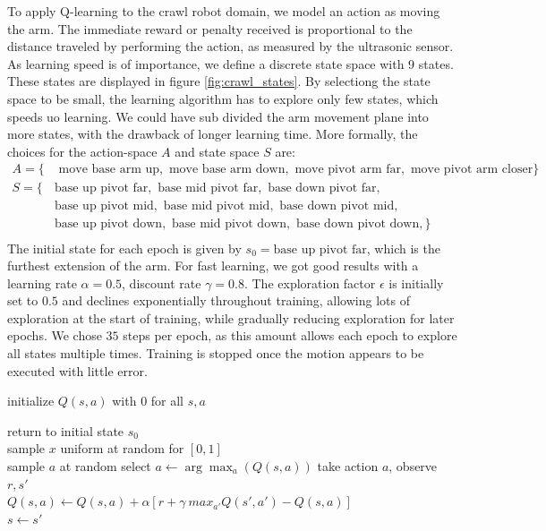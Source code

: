 \documentclass[11pt, a4paper]{article}
\begin{document}
To apply Q-learning to the crawl robot domain, we model an action as moving the arm. The immediate reward or penalty received is proportional to the distance traveled by performing the action, as measured by the ultrasonic sensor. As learning speed is of importance, we define a discrete state space with 9 states. These states are displayed in figure \ref{fig:crawl_states}. By selectiong the state space to be small, the learning algorithm has to explore only few states, which speeds uo learning. We could have sub divided the arm movement plane into more states, with the drawback of longer learning time. More formally, the choices for the action-space $A$ and state space $S$ are:
\begin{align*}
	A = \{ &\text{ move base arm up}, \text{ move base arm down} , \text{ move pivot arm far}, \text{ move pivot arm closer}\} \\
	S = \{ &\text{base up pivot far}, \text{ base mid pivot far}, \text{ base down pivot far}, \\
	       &\text{base up pivot mid}, \text{ base mid pivot mid}, \text{ base down pivot mid},\\
	       &\text{base up pivot down}, \text{ base mid pivot down}, \text{ base down pivot down},\} \\
\end{align*}
The initial state for each epoch is given by $s_0 = \text{base up pivot far}$, which is the furthest extension of the arm. For fast learning, we got good results with a learning rate $\alpha = 0.5$, discount rate $\gamma = 0.8$. The exploration factor $\epsilon$ is initially set to $0.5$ and declines exponentially throughout training, allowing lots of exploration at the start of training, while gradually reducing exploration for later epochs. We chose $35$ steps per epoch, as this amount allows each epoch to explore all states multiple times. Training is stopped once the motion appears to be executed with little error.

\begin{algorithm}[H]
	
	\Input{learning rate $\alpha \in ]0,1]$, discount rate $\gamma \in [0,1[$}
	initialize $Q(s, a)$ with $0$ for all $s,a$\\
	{
		return to initial state $s_0$ \\
		{
			sample $x$ uniform at random for $[0,1]$ \\
			{sample $a$ at random}
			{select $a \leftarrow \arg \max_a(Q(s,a))$}	
			take action $a$, observe $r, s'$ \\
			$Q(s,a) \leftarrow Q(s,a) + \alpha [r + \gamma \  max_{a'} Q(s', a') - Q(s,a)]$ \\
			$s \leftarrow s'$
		}
		
	}
	\caption{Q-learning with $\epsilon$-greedy exploration}
	\label{alg:q-learn}
\end{algorithm}
\end{document}
